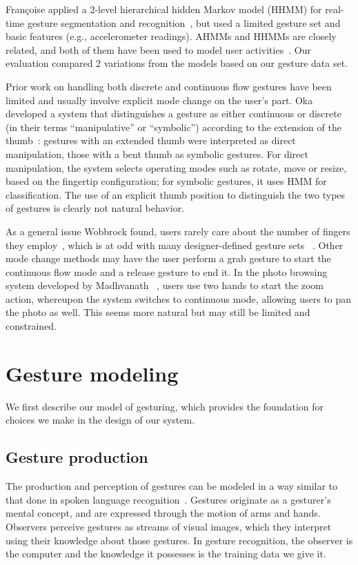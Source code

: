 \documentclass[10pt,twocolumn,letterpaper]{article}
\begin{document}
Fran\c coise applied a 2-level hierarchical hidden Markov model (HHMM) for real-time 
gesture segmentation and recognition~\cite{francoise10}, but used a limited gesture set and basic features (e.g., accelerometer readings).
AHMMs and HHMMs are closely related, and both of them have been used to model user activities~\cite{nguyen03, nguyen05}. Our
evaluation compared 2 variations from the models based on our gesture data set.

Prior work on handling both discrete and continuous flow gestures have been limited and 
usually involve explicit mode change on the user's part. Oka \etal developed a 
system that distinguishes a gesture as either continuous or discrete (in their 
terms ``manipulative'' or ``symbolic'') according to the extension of the 
thumb~\cite{Oka02}: gestures with an extended thumb were interpreted as direct manipulation,
 those with a bent thumb as symbolic gestures. For direct manipulation, the
system selects operating modes such as rotate, move or resize, based on the fingertip
configuration; for symbolic gestures, it uses HMM for classification. The use of
an explicit thumb position to distinguish the two types of gestures is clearly not natural behavior.

As a general issue Wobbrock \etal found, users rarely care about the number of fingers they 
employ~\cite{Wobbrock09}, which is at odd with many designer-defined gesture sets
~\cite{Malik05, Morris06, Rekimoto02, Tse06}. Other mode change methods may have the
user perform a grab gesture to start the continuous flow mode and a release gesture
to end it. In the photo browsing system developed by Madhvanath \etal~\cite{Madhvanath12},
users use two hands to start the zoom action, whereupon the system switches to continuous
mode, allowing users to pan the photo as well. This seems more natural but may still
be limited and constrained. 

\section{Gesture modeling} \label{sec:gesture-modeling}
We first describe our model of gesturing, which provides the foundation for choices we
make in the design of our system. 

\subsection{Gesture production}
The production and perception of gestures 
can be modeled in a way similar to that done in spoken language recognition~\cite{Pavlovic97}.
Gestures originate as a gesturer's mental concept, and are expressed through the motion of arms and 
hands. Observers perceive gestures as streams of visual images, which they
interpret using their knowledge about those gestures. In gesture recognition, the 
observer is the computer and the knowledge it possesses is the training data we 
give it.
\end{document}
